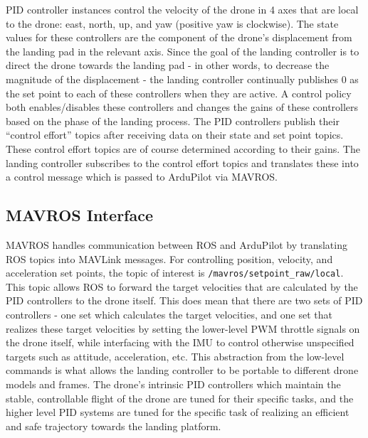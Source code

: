 \gls{PID} controller instances control the velocity of the drone in 4 axes that are local to the drone: east, north, up, and yaw (positive yaw is clockwise). The state values for these controllers are the component of the drone's displacement from the landing pad in the relevant axis. Since the goal of the landing controller is to direct the drone towards the landing pad - in other words, to decrease the magnitude of the displacement - the landing controller continually publishes 0 as the set point to each of these controllers when they are active. A control policy both enables/disables these controllers and changes the gains of these controllers based on the phase of the landing process. The \gls{PID} controllers publish their ``control effort'' topics after receiving data on their state and set point topics. These control effort topics are of course determined according to their gains. The landing controller subscribes to the control effort topics and translates these into a control message which is passed to ArduPilot via MAVROS.

\subsection{MAVROS Interface}

MAVROS handles communication between ROS and ArduPilot by translating ROS topics into MAVLink messages. For controlling position, velocity, and acceleration set points, the topic of interest is \texttt{/mavros/setpoint\_raw/local}. This topic allows ROS to forward the target velocities that are calculated by the PID controllers to the drone itself. This does mean that there are two sets of PID controllers - one set which calculates the target velocities, and one set that realizes these target velocities by setting the lower-level \gls{PWM} throttle signals on the drone itself, while interfacing with the \gls{IMU} to control otherwise unspecified targets such as attitude, acceleration, etc. This abstraction from the low-level commands is what allows the landing controller to be portable to different drone models and frames. The drone's intrinsic PID controllers which maintain the stable, controllable flight of the drone are tuned for their specific tasks, and the higher level PID systems are tuned for the specific task of realizing an efficient and safe trajectory towards the landing platform.


